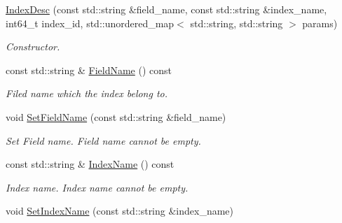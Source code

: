 \begin{DoxyCompactItemize}
\item 
\mbox{\label{classmilvus_1_1_index_desc_a2092ba6a3b857aad3c50cc7488b79d03}} 
\hyperlink{classmilvus_1_1_index_desc_a2092ba6a3b857aad3c50cc7488b79d03}{Index\+Desc} (const std\+::string \&field\+\_\+name, const std\+::string \&index\+\_\+name, int64\+\_\+t index\+\_\+id, std\+::unordered\+\_\+map$<$ std\+::string, std\+::string $>$ params)
\begin{DoxyCompactList}\small\item\em Constructor. \end{DoxyCompactList}\item 
\mbox{\label{classmilvus_1_1_index_desc_a7d77f73748275653f45d8e43bbfed29a}} 
const std\+::string \& \hyperlink{classmilvus_1_1_index_desc_a7d77f73748275653f45d8e43bbfed29a}{Field\+Name} () const
\begin{DoxyCompactList}\small\item\em Filed name which the index belong to. \end{DoxyCompactList}\item 
\mbox{\label{classmilvus_1_1_index_desc_a16db300b7f71fe55d086ff9372f9b041}} 
void \hyperlink{classmilvus_1_1_index_desc_a16db300b7f71fe55d086ff9372f9b041}{Set\+Field\+Name} (const std\+::string \&field\+\_\+name)
\begin{DoxyCompactList}\small\item\em Set Field name. Field name cannot be empty. \end{DoxyCompactList}\item 
\mbox{\label{classmilvus_1_1_index_desc_a872f191a1af296330643481abf40592a}} 
const std\+::string \& \hyperlink{classmilvus_1_1_index_desc_a872f191a1af296330643481abf40592a}{Index\+Name} () const
\begin{DoxyCompactList}\small\item\em Index name. Index name cannot be empty. \end{DoxyCompactList}\item 
\mbox{\label{classmilvus_1_1_index_desc_ad0423fffeab0948b133625701f7dcf0a}} 
void \hyperlink{classmilvus_1_1_index_desc_ad0423fffeab0948b133625701f7dcf0a}{Set\+Index\+Name} (const std\+::string \&index\+\_\+name)

\end{DoxyCompactItemize}
